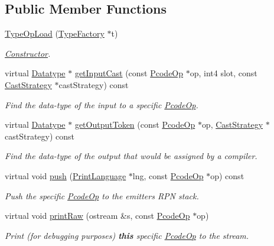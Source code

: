 \subsection*{Public Member Functions}
\begin{DoxyCompactItemize}
\item 
\mbox{\hyperlink{class_type_op_load_a2bb47ba8fb5e60b6877ed13e9205f063}{Type\+Op\+Load}} (\mbox{\hyperlink{class_type_factory}{Type\+Factory}} $\ast$t)
\begin{DoxyCompactList}\small\item\em \mbox{\hyperlink{class_constructor}{Constructor}}. \end{DoxyCompactList}\item 
virtual \mbox{\hyperlink{class_datatype}{Datatype}} $\ast$ \mbox{\hyperlink{class_type_op_load_a42e0b10ae74a6839bffc18f3e36bb02a}{get\+Input\+Cast}} (const \mbox{\hyperlink{class_pcode_op}{Pcode\+Op}} $\ast$op, int4 slot, const \mbox{\hyperlink{class_cast_strategy}{Cast\+Strategy}} $\ast$cast\+Strategy) const
\begin{DoxyCompactList}\small\item\em Find the data-\/type of the input to a specific \mbox{\hyperlink{class_pcode_op}{Pcode\+Op}}. \end{DoxyCompactList}\item 
virtual \mbox{\hyperlink{class_datatype}{Datatype}} $\ast$ \mbox{\hyperlink{class_type_op_load_a212b3d08a86b73ca49c2adf1aac7b60a}{get\+Output\+Token}} (const \mbox{\hyperlink{class_pcode_op}{Pcode\+Op}} $\ast$op, \mbox{\hyperlink{class_cast_strategy}{Cast\+Strategy}} $\ast$cast\+Strategy) const
\begin{DoxyCompactList}\small\item\em Find the data-\/type of the output that would be assigned by a compiler. \end{DoxyCompactList}\item 
virtual void \mbox{\hyperlink{class_type_op_load_a9352b52888c950ee3a9ca6d50014a23c}{push}} (\mbox{\hyperlink{class_print_language}{Print\+Language}} $\ast$lng, const \mbox{\hyperlink{class_pcode_op}{Pcode\+Op}} $\ast$op) const
\begin{DoxyCompactList}\small\item\em Push the specific \mbox{\hyperlink{class_pcode_op}{Pcode\+Op}} to the emitter\textquotesingle{}s R\+PN stack. \end{DoxyCompactList}\item 
virtual void \mbox{\hyperlink{class_type_op_load_a816c1525151795d00561fdea1d37806c}{print\+Raw}} (ostream \&s, const \mbox{\hyperlink{class_pcode_op}{Pcode\+Op}} $\ast$op)
\begin{DoxyCompactList}\small\item\em Print (for debugging purposes) {\bfseries{this}} specific \mbox{\hyperlink{class_pcode_op}{Pcode\+Op}} to the stream. \end{DoxyCompactList}\end{DoxyCompactItemize}
